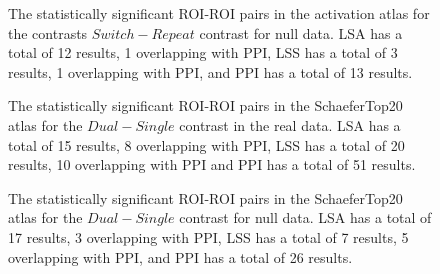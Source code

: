 \documentclass[phd,appendix,figures]{uithesis}
\begin{document}
\begin{figure}[H]
  \ContinuedFloat
  \centering


  \caption{
      The statistically significant ROI-ROI pairs in the activation atlas
      for the contrasts $Switch - Repeat$ contrast for null data.
      LSA has a total of 12 results, 1 overlapping with PPI,
      LSS has a total of 3 results, 1 overlapping with PPI,
      and PPI has a total of 13 results.
  }
  \label{fig:data-null_type-brain_atlas-activation_contrast-switchxrepeat}
\end{figure}
\begin{figure}[H]
  \centering


  \caption{
      The statistically significant ROI-ROI pairs in the SchaeferTop20 atlas
      for the $Dual - Single$ contrast in the real data.
      LSA has a total of 15 results, 8 overlapping with PPI,
      LSS has a total of 20 results, 10 overlapping with PPI and
      PPI has a total of 51 results.
  }
  \label{fig:data-real_type-brain_atlas-schaeferbest_contrast-dualxsingle}
\end{figure}

\begin{figure}[H]
  \ContinuedFloat
  \centering


  \caption{
      The statistically significant ROI-ROI pairs in the SchaeferTop20 atlas
      for the $Dual - Single$ contrast for null data.
      LSA has a total of 17 results, 3 overlapping with PPI,
      LSS has a total of 7 results, 5 overlapping with PPI,
      and PPI has a total of 26 results.
  }
  \label{fig:data-null_type-brain_atlas-schaeferbest_contrast-dualxsingle}
\end{figure}
\end{document}
